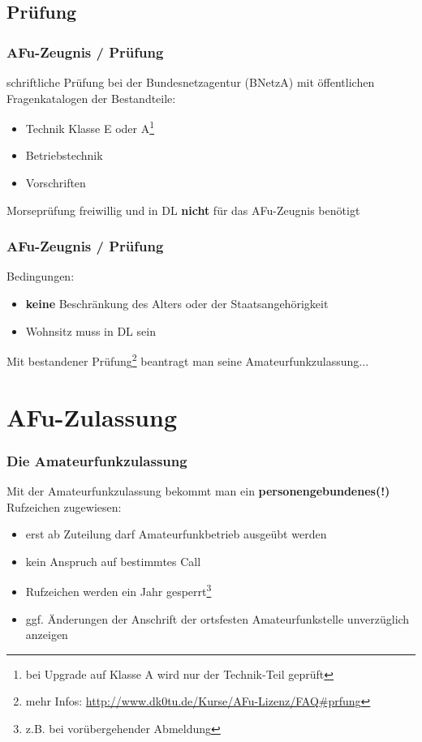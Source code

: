\subsection{Prüfung}

\begin{frame}
    \frametitle{AFu-Zeugnis / Prüfung}

    schriftliche Prüfung bei der Bundesnetzagentur (BNetzA) mit öffentlichen
    Fragenkatalogen der Bestandteile:

    \begin{itemize}
        \item Technik Klasse E oder A\footnote{bei Upgrade auf Klasse A wird nur
              der Technik-Teil geprüft}
        \item Betriebstechnik
        \item Vorschriften
    \end{itemize}

    \vspace{2em}

    Morseprüfung freiwillig und in DL \textbf{nicht} für das AFu-Zeugnis benötigt

\end{frame}

\begin{frame}
    \frametitle{AFu-Zeugnis / Prüfung}

    Bedingungen:

    \begin{itemize}
        \item \textbf{keine} Beschränkung des Alters oder der Staatsangehörigkeit
        \item Wohnsitz muss in DL sein
    \end{itemize}

    Mit bestandener Prüfung\footnote{mehr Infos: \scriptsize
    \url{http://www.dk0tu.de/Kurse/AFu-Lizenz/FAQ\#prfung}} beantragt man seine
    Amateurfunkzulassung...

\end{frame}

\section{AFu-Zulassung}

\begin{frame}
    \frametitle{Die Amateurfunkzulassung}

    Mit der Amateurfunkzulassung bekommt man ein \textbf{personengebundenes(!)}
    Rufzeichen zugewiesen:

    \begin{itemize}
        \item erst ab Zuteilung darf Amateurfunkbetrieb ausgeübt werden
        \item kein Anspruch auf bestimmtes Call
        \item Rufzeichen werden ein Jahr gesperrt\footnote{z.B. bei vorübergehender Abmeldung}
        \item ggf. Änderungen der Anschrift der ortsfesten Amateurfunkstelle
              unverzüglich anzeigen
    \end{itemize}

\end{frame}

